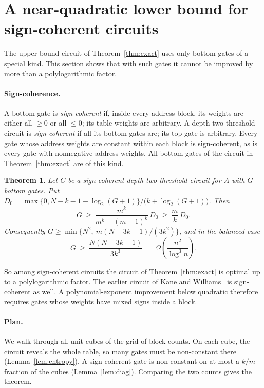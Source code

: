 \documentclass[11pt,letterpaper]{article}
\newtheorem{theorem}{Theorem}
\theoremstyle{remark}
\begin{document}
\section{A near-quadratic lower bound for sign-coherent circuits}\label{sec:coherent}

The upper bound circuit of Theorem~\ref{thm:exact} uses only bottom gates of a special
kind. This section shows that with such gates it cannot be improved by more
than a polylogarithmic factor.

\paragraph*{Sign-coherence.}
A bottom gate is \emph{sign-coherent} if, inside every address block, its
weights are either all $\ge0$ or all $\le0$; its table weights are
arbitrary. A depth-two threshold circuit is \emph{sign-coherent} if all its
bottom gates are; its top gate is arbitrary. Every gate whose address
weights are constant within each block is sign-coherent, as is every gate
with nonnegative address weights. All bottom gates of the circuit in Theorem~\ref{thm:exact} are of this kind.

\begin{theorem}\label{thm:coherent}
Let $C$ be a sign-coherent depth-two threshold circuit for $A$ with $G$
bottom gates. Put $D_0=\max\{0,N-k-1-\log_2(G+1)\}/\bigl(k+\log_2(G+1)\bigr)$. Then
\[
G\ \ge\ \frac{m^k}{m^k-(m-1)^k}\,D_0\ \ge\ \frac mk\,D_0 .
\]
Consequently $G\ge\min\{N^2,\ m(N-3k-1)/(3k^2)\}$, and in the balanced case
\[
G\ \ge\ \frac{N(N-3k-1)}{3k^3}\ =\ \Omega\!\left(\frac{n^2}{\log^3 n}\right).
\]
\end{theorem}

So among sign-coherent circuits the circuit of Theorem~\ref{thm:exact} is
optimal up to a polylogarithmic factor. The earlier circuit of Kane and
Williams~\cite[Thm.~1.2]{KW} is sign-coherent as well. A polynomial-exponent improvement below quadratic therefore requires
gates whose weights have mixed signs inside a block.

\paragraph*{Plan.}
We walk through all unit cubes of the grid of block counts. On each cube,
the circuit reveals the whole table, so many gates must be non-constant there
(Lemma~\ref{lem:entropy}). A sign-coherent gate is non-constant on at most a
$k/m$ fraction of the cubes (Lemma~\ref{lem:diag}). Comparing the two counts
gives the theorem.
\end{document}
